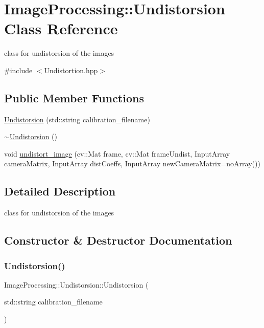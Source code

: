 \hypertarget{class_image_processing_1_1_undistorsion}{}\section{Image\+Processing\+:\+:Undistorsion Class Reference}
\label{class_image_processing_1_1_undistorsion}


class for undistorsion of the images  




{\ttfamily \#include $<$Undistortion.\+hpp$>$}

\subsection*{Public Member Functions}
\begin{DoxyCompactItemize}
\item 
\mbox{\hyperlink{class_image_processing_1_1_undistorsion_afeed0c8d0fd647f172a915d44cfb53bf}{Undistorsion}} (std\+::string calibration\+\_\+filename)
\item 
\mbox{\hyperlink{class_image_processing_1_1_undistorsion_a1ce4c30154a1ae1253b8b0d990561ac5}{$\sim$\+Undistorsion}} ()
\item 
void \mbox{\hyperlink{class_image_processing_1_1_undistorsion_ab286d4b5746b8b2716fab24578c27a44}{undistort\+\_\+image}} (cv\+::\+Mat frame, cv\+::\+Mat frame\+Undist, Input\+Array camera\+Matrix, Input\+Array dist\+Coeffs, Input\+Array new\+Camera\+Matrix=no\+Array())
\end{DoxyCompactItemize}


\subsection{Detailed Description}
class for undistorsion of the images 

\subsection{Constructor \& Destructor Documentation}
\mbox{\label{class_image_processing_1_1_undistorsion_afeed0c8d0fd647f172a915d44cfb53bf}} 
\subsubsection{\texorpdfstring{Undistorsion()}{Undistorsion()}}
{\footnotesize\ttfamily Image\+Processing\+::\+Undistorsion\+::\+Undistorsion (\begin{DoxyParamCaption}\item[{std\+::string}]{calibration\+\_\+filename }\end{DoxyParamCaption})}

